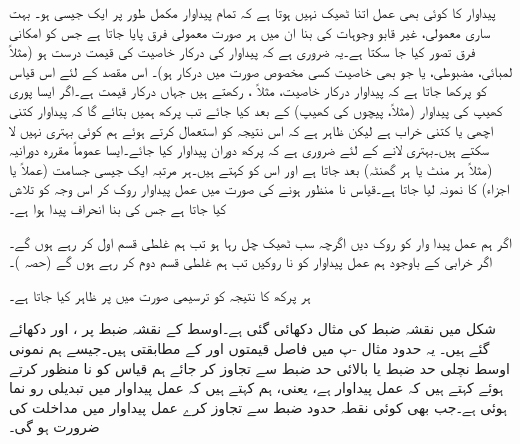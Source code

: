 پیداوار کا کوئی بھی عمل اتنا ٹھیک نہیں ہوتا ہے کہ تمام پیداوار مکمل طور پر ایک جیسی ہو۔  بہت ساری معمولی، غیر قابو وجوہات کی بنا ان میں ہر صورت معمولی فرق پایا جاتا ہے جس کو امکانی فرق تصور کیا جا سکتا ہے۔یہ ضروری ہے کہ پیداوار کی درکار خاصیت کی قیمت درست ہو (مثلاً لمبائی، مضبوطی، یا جو بھی خاصیت کسی مخصوص صورت میں درکار ہو)۔ اس مقصد کے لئے اس قیاس کو پرکھا جاتا ہے کہ پیداوار درکار خاصیت، مثلاً ، رکھتے ہیں جہاں  درکار قیمت ہے۔اگر ایسا پوری کھیپ کی پیداوار (مثلاً،  پیچوں کی کھیپ) کے بعد کیا جائے تب پرکھ ہمیں بتائے گا کہ  پیداوار کتنی اچھی یا کتنی خراب ہے لیکن ظاہر ہے کہ اس نتیجہ کو استعمال کرتے ہوئے ہم کوئی بہتری نہیں لا سکتے ہیں۔بہتری لانے کے لئے ضروری ہے کہ پرکھ دوران پیداوار کیا جائے۔ایسا عموماً مقررہ دورانیہ (مثلاً ہر  منٹ یا ہر گھنٹہ) بعد جاتا ہے اور اس کو  کہتے ہیں۔ہر مرتبہ ایک جیسی جسامت (عملاً  یا  اجزاء) کا نمونہ لیا جاتا ہے۔قیاس نا منظور ہونے کی صورت میں عمل پیداوار روک کر اس وجہ کو تلاش کیا جاتا ہے جس کی بنا انحراف پیدا ہوا ہے۔

اگر ہم عمل پیدا وار کو روک دیں اگرچہ سب ٹھیک چل رہا ہو تب ہم غلطی قسم اول  کر رہے ہوں گے۔اگر خرابی کے باوجود ہم عمل پیداوار کو نا روکیں تب ہم غلطی قسم دوم  کر رہے ہوں گے (حصہ )۔

ہر پرکھ کا نتیجہ کو ترسیمی صورت میں  پر ظاہر کیا جاتا ہے۔

شکل  میں نقشہ ضبط کی مثال دکھائی گئی ہے۔اوسط کے نقشہ ضبط پر  ،   اور   دکھائے گئے ہیں۔ یہ  حدود مثال -پ میں فاصل قیمتوں  اور  کے مطابقتی ہیں۔جیسے ہم نمونی اوسط نچلی حد ضبط یا بالائی حد ضبط سے تجاوز کر جائے ہم قیاس کو نا منظور کرتے ہوئے کہتے ہیں کہ عمل پیداوار  ہے، یعنی، ہم کہتے ہیں کہ عمل پیداوار میں تبدیلی رو نما ہوئی ہے۔جب بھی کوئی نقطہ حدود ضبط سے تجاوز کرے عمل پیداوار میں مداخلت کی ضرورت ہو گی۔

